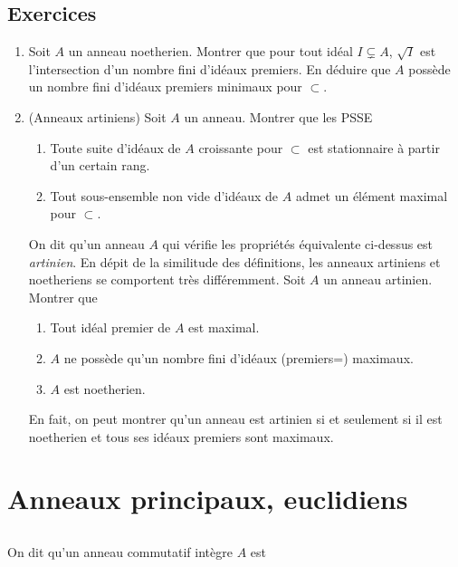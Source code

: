 \documentclass[a4paper, 12pt]{amsart}
\begin{document}
\subsection{Exercices}\label{NoethExercices}
    \begin{enumerate}[leftmargin=* ,parsep=0cm,itemsep=0cm,topsep=0cm]
     \item  Soit $A$ un anneau noetherien. Montrer que pour tout idéal  $I\subsetneq A$, $\sqrt{I}$ est l'intersection d'un nombre fini d'idéaux premiers. En déduire que $A$ possède un nombre fini d'idéaux premiers minimaux pour $\subset$. \\
     \item   (Anneaux artiniens) Soit $A$ un anneau. Montrer que les PSSE\\
       \begin{enumerate} 
     \item  Toute suite  d'idéaux de $A$ croissante pour $\subset$ est stationnaire à partir d'un certain rang.
     \item Tout sous-ensemble non vide d'idéaux de $A$ admet un élément maximal pour $\subset $.\\
\end{enumerate}
 On dit qu'un anneau $A$ qui vérifie les propriétés équivalente ci-dessus est \textit{artinien}. En dépit de la similitude des définitions, les anneaux artiniens et noetheriens se comportent très différemment. Soit $A$ un anneau artinien. Montrer que\\
 \begin{enumerate} 
     \item  Tout idéal premier de $A $ est maximal.
     \item  $A$ ne possède qu'un nombre fini d'idéaux (premiers=) maximaux.
      \item  $A$ est noetherien.\\
\end{enumerate}
En fait, on peut montrer qu'un anneau est artinien si et seulement si il est noetherien et tous ses idéaux premiers sont maximaux. 
\end{enumerate}



  \section{Anneaux principaux, euclidiens } 

\subsection{ }On dit qu'un anneau commutatif intègre $A$ est \\
\end{document}
